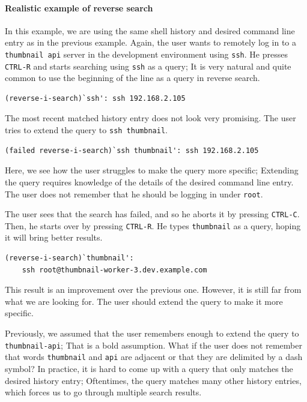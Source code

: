 \paragraph{Realistic example of reverse search}

In this example, we are using the same shell history and desired command line entry as in the previous example. Again, the user wants to remotely log in to a \verb|thumbnail api| server in the development environment using \verb|ssh|. He presses \verb|CTRL-R| and starts searching using \verb|ssh| as a query; It is very natural and quite common to use the beginning of the line as a query in reverse search.

\begin{verbatim}
(reverse-i-search)`ssh': ssh 192.168.2.105
\end{verbatim}

The most recent matched history entry does not look very promising. The user tries to extend the query to \verb|ssh thumbnail|.

\begin{verbatim}
(failed reverse-i-search)`ssh thumbnail': ssh 192.168.2.105
\end{verbatim}

Here, we see how the user struggles to make the query more specific; Extending the query requires knowledge of the details of the desired command line entry. The user does not remember that he should be logging in under \verb|root|. %

The user sees that the search has failed, and so he aborts it by pressing \verb|CTRL-C|. Then, he starts over by pressing \verb|CTRL-R|. He types \verb|thumbnail| as a query, hoping it will bring better results.


\begin{verbatim}
(reverse-i-search)`thumbnail':
    ssh root@thumbnail-worker-3.dev.example.com
\end{verbatim}

This result is an improvement over the previous one. However, it is still far from what we are looking for. The user should extend the query to make it more specific. 

Previously, we assumed that the user remembers enough to extend the query to \verb|thumbnail-api|; That is a bold assumption. What if the user does not remember that words \verb|thumbnail| and \verb|api| are adjacent or that they are delimited by a dash symbol? In practice, it is hard to come up with a query that only matches the desired history entry; Oftentimes, the query matches many other history entries, which forces us to go through multiple search results.


